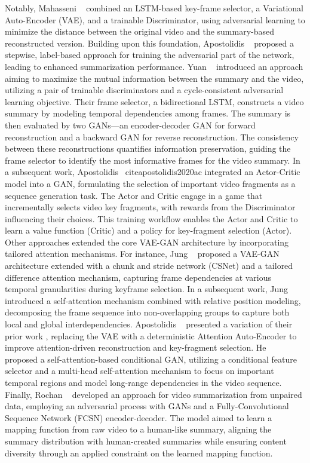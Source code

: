 Notably, Mahasseni \etal~\cite{mahasseni2017unsupervised} combined an LSTM-based key-frame selector, a Variational Auto-Encoder (VAE), and a trainable Discriminator, using adversarial learning to minimize the distance between the original video and the summary-based reconstructed version. Building upon this foundation, Apostolidis \etal~\cite{apostolidis2019stepwise} proposed a stepwise, label-based approach for training the adversarial part of the network, leading to enhanced summarization performance. Yuan \etal~\cite{yuan2019cycle} introduced an approach aiming to maximize the mutual information between the summary and the video, utilizing a pair of trainable discriminators and a cycle-consistent adversarial learning objective. Their frame selector, a bidirectional LSTM, constructs a video summary by modeling temporal dependencies among frames. The summary is then evaluated by two GANs—an encoder-decoder GAN for forward reconstruction and a backward GAN for reverse reconstruction. The consistency between these reconstructions quantifies information preservation, guiding the frame selector to identify the most informative frames for the video summary. In a subsequent work, Apostolidis \etal~cite{apostolidis2020ac} integrated an Actor-Critic model into a GAN, formulating the selection of important video fragments as a sequence generation task. The Actor and Critic engage in a game that incrementally selects video key fragments, with rewards from the Discriminator influencing their choices. This training workflow enables the Actor and Critic to learn a value function (Critic) and a policy for key-fragment selection (Actor). Other approaches extended the core VAE-GAN architecture by incorporating tailored attention mechanisms. For instance, Jung \etal~\cite{jung2019discriminative} proposed a VAE-GAN architecture extended with a chunk and stride network (CSNet) and a tailored difference attention mechanism, capturing frame dependencies at various temporal granularities during keyframe selection. In a subsequent work, Jung \etal~\cite{jung2020global} introduced a self-attention mechanism combined with relative position modeling, decomposing the frame sequence into non-overlapping groups to capture both local and global interdependencies. Apostolidis \etal~\cite{apostolidis2020unsupervised} presented a variation of their prior work \cite{apostolidis2019stepwise}, replacing the VAE with a deterministic Attention Auto-Encoder to improve attention-driven reconstruction and key-fragment selection. He \etal~\cite{he2019unsupervised} proposed a self-attention-based conditional GAN, utilizing a conditional feature selector and a multi-head self-attention mechanism to focus on important temporal regions and model long-range dependencies in the video sequence. Finally, Rochan \etal~\cite{rochan2019video} developed an approach for video summarization from unpaired data, employing an adversarial process with GANs and a Fully-Convolutional Sequence Network (FCSN) encoder-decoder. The model aimed to learn a mapping function from raw video to a human-like summary, aligning the summary distribution with human-created summaries while ensuring content diversity through an applied constraint on the learned mapping function.

